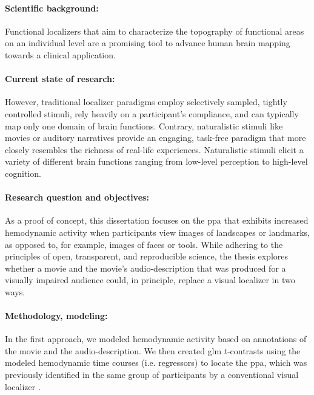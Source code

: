 
\paragraph{Scientific background:}
Functional localizers that aim to characterize the topography of functional
areas on an individual level are a promising tool to advance human brain
mapping towards a clinical application.

\paragraph{Current state of research:}
However, traditional localizer paradigms employ selectively sampled, tightly
controlled stimuli, rely heavily on a participant's compliance, and can
typically map only one domain of brain functions.
Contrary, naturalistic stimuli like movies or auditory narratives provide an
engaging, task-free paradigm that more closely resembles the richness of
real-life experiences.
%
Naturalistic stimuli elicit a variety of different brain functions ranging from
low-level perception to high-level cognition.

\paragraph{Research question and objectives:}
As a proof of concept, this dissertation focuses on the \ac{ppa} that exhibits
increased hemodynamic activity when participants view images of landscapes or
landmarks, as opposed to, for example, images of faces or tools.
%
While adhering to the principles of open, transparent, and reproducible
science, the thesis explores whether a movie and the movie's audio-description
that was produced for a visually impaired audience could, in principle, replace
a visual localizer in two ways.

\paragraph{Methodology, modeling:}


In the first approach, we modeled hemodynamic activity based on annotations of
the movie and the audio-description.
We then created \ac{glm} $t$-contrasts using the modeled hemodynamic time
courses (i.e. regressors) to locate the \ac{ppa}, which was previously
identified in the same group of participants by a conventional visual localizer
\citep{sengupta2016extension}.

